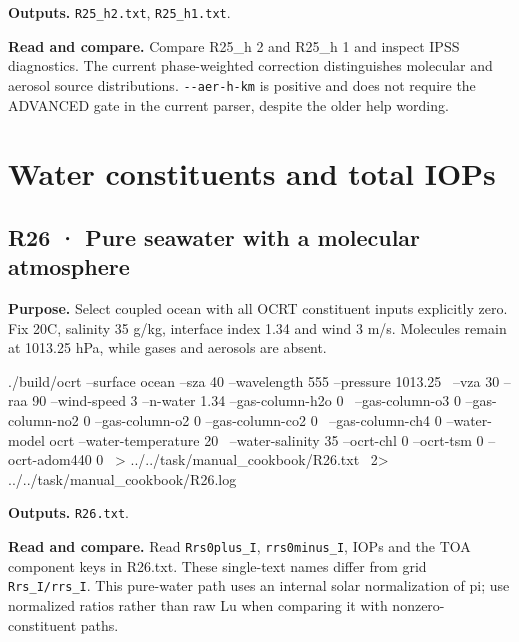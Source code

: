 \textbf{Outputs. }\texttt{R25\_\allowbreak{}h2.txt}, \texttt{R25\_\allowbreak{}h1.txt}.

\textbf{Read and compare. }Compare R25\_h 2 and R25\_h 1 and inspect IPSS diagnostics. The current phase-weighted correction distinguishes molecular and aerosol source distributions. \texttt{-\allowbreak{}-\allowbreak{}aer-\allowbreak{}h-\allowbreak{}km} is positive and does not require the ADVANCED gate in the current parser, despite the older help wording.

\section{Water constituents and total IOPs}
\label{sec:auto:09_cookbook:6}


\subsection{R26 · Pure seawater with a molecular atmosphere}
\label{sec:auto:09_cookbook:6.1}

\label{recipe:R26}

\textbf{Purpose. }Select coupled ocean with all OCRT constituent inputs explicitly zero. Fix 20\textdegree{}C, salinity 35 g/kg, interface index 1.34 and wind 3 m/s. Molecules remain at 1013.25 hPa, while gases and aerosols are absent.

\noindent\begin{minipage}{\linewidth}
\begin{ManualCode}

./build/ocrt --surface ocean --sza 40 --wavelength 555 --pressure 1013.25 \
  --vza 30 --raa 90 --wind-speed 3 --n-water 1.34 --gas-column-h2o 0 \
  --gas-column-o3 0 --gas-column-no2 0 --gas-column-o2 0 --gas-column-co2 0 \
  --gas-column-ch4 0 --water-model ocrt --water-temperature 20 \
  --water-salinity 35 --ocrt-chl 0 --ocrt-tsm 0 --ocrt-adom440 0 \
  > ../../task/manual_cookbook/R26.txt \
  2> ../../task/manual_cookbook/R26.log

\end{ManualCode}
\end{minipage}\par

\textbf{Outputs. }\texttt{R26.txt}.

\textbf{Read and compare. }Read \texttt{Rrs0plus\_\allowbreak{}I}, \texttt{rrs0minus\_\allowbreak{}I}, IOPs and the TOA component keys in R26.txt. These single-text names differ from grid \texttt{Rrs\_\allowbreak{}I/\allowbreak{}rrs\_\allowbreak{}I}. This pure-water path uses an internal solar normalization of pi; use normalized ratios rather than raw Lu when comparing it with nonzero-constituent paths.

